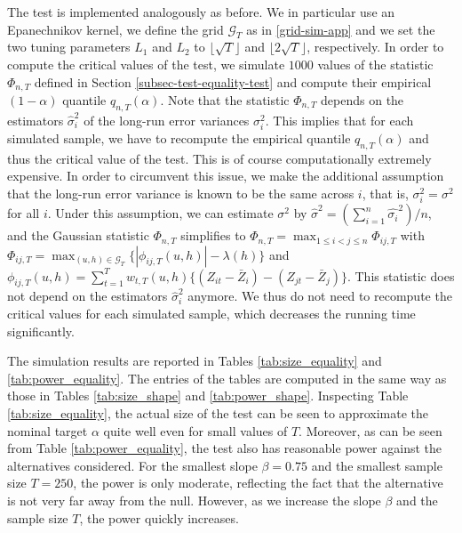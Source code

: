 The test is implemented analogously as before. We in particular use an Epanechnikov kernel, we define the grid $\mathcal{G}_T$ as in \eqref{grid-sim-app} and we set the two tuning parameters $L_1$ and $L_2$ to $\lfloor \sqrt{T} \rfloor$ and $\lfloor 2\sqrt{T} \rfloor$, respectively. In order to compute the critical values of the test, we simulate $1000$ values of the statistic $\Phi_{n,T}$ defined in Section \ref{subsec-test-equality-test} and compute their empirical $(1-\alpha)$ quantile $q_{n,T}(\alpha)$. Note that the statistic $\Phi_{n,T}$ depends on the estimators $\widehat{\sigma}_i^2$ of the long-run error variances $\sigma_i^2$. This implies that for each simulated sample, we have to recompute the empirical quantile $q_{n,T}(\alpha)$ and thus the critical value of the test. This is of course computationally extremely expensive. In order to circumvent this issue, we make the additional assumption that the long-run error variance is known to be the same across $i$, that is, $\sigma_i^2 = \sigma^2$ for all $i$. Under this assumption, we can estimate $\sigma^2$ by $\widehat{\sigma}^2 = (\sum_{i = 1}^n\widehat{\sigma_i}^2)/n$, and the Gaussian statistic $\Phi_{n,T}$ simplifies to $\Phi_{n,T} = \max_{1 \le i < j \le n} \Phi_{ij,T}$ with $\Phi_{ij,T} = \max_{(u,h) \in \mathcal{G}_T} \{ | \phi_{ij,T}(u,h)| - \lambda(h) \}$ and $\phi_{ij,T}(u,h) = \sum_{t=1}^T w_{t,T}(u,h) \{ (Z_{it} - \bar{Z}_i) - (Z_{jt} - \bar{Z}_j)\}$. This statistic does not depend on the estimators $\widehat{\sigma}_i^2$ anymore. We thus do not need to recompute the critical values for each simulated sample, which decreases the running time significantly.


The simulation results are reported in Tables \ref{tab:size_equality} and \ref{tab:power_equality}. The entries of the tables are computed in the same way as those in Tables \ref{tab:size_shape} and \ref{tab:power_shape}. Inspecting Table \ref{tab:size_equality}, the actual size of the test can be seen to approximate the nominal target $\alpha$ quite well even for small values of $T$. Moreover, as can be seen from Table \ref{tab:power_equality}, the test also has reasonable power against the alternatives considered. For the smallest slope $\beta=0.75$ and the smallest sample size $T = 250$, the power is only moderate, reflecting the fact that the alternative is not very far away from the null. However, as we increase the slope $\beta$ and the sample size $T$, the power quickly increases. 


